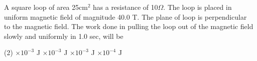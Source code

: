\item A square loop of area 25$\text{cm}^2$ has a resistance of 10$\Omega$. The loop is placed in uniform magnetic field of magnitude 40.0 T. The plane of loop is perpendicular to the magnetic field. The work done in pulling the loop out of the magnetic field slowly and uniformly in 1.0 sec, will be
    \begin{tasks}(2)
        $\times 10^{-3}$ J
        $\times 10^{-3}$ J
        $\times 10^{-3}$ J
        $\times 10^{-4}$ J
    \end{tasks}
